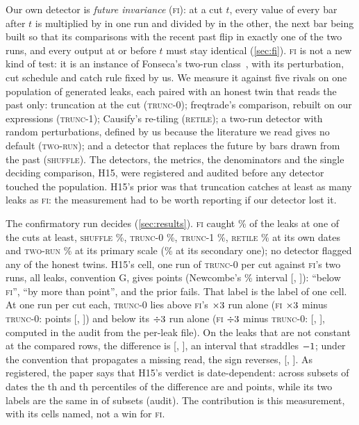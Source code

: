 \documentclass[11pt]{article}
\newcommand{\FI}{\textsc{fi}}
\newcommand{\TZ}{\textsc{trunc-0}}
\newcommand{\TO}{\textsc{trunc-1}}
\newcommand{\RT}{\textsc{retile}}
\newcommand{\TR}{\textsc{two-run}}
\newcommand{\SH}{\textsc{shuffle}}
\newcommand{\pct}{\%}
\begin{document}
Our own detector is \emph{future invariance} (\FI): at a cut $t$, every value of every bar after
$t$ is multiplied by \NumFIup{} in one run and divided by \NumFIdown{} in the other, the next bar
being built so that its comparisons with the recent past flip in exactly one of the two runs, and
every output at or before $t$ must stay identical (\cref{sec:fi}). \FI{} is not a new kind of
test: it is an instance of Fonseca's two-run class~\cite{fonseca2026}, %
with its perturbation, cut schedule and catch rule fixed by us. We measure it against five
rivals on one population of \NumPopN{} generated leaks, each paired with an honest twin that reads
the past only: truncation at the cut (\TZ); freqtrade's comparison, rebuilt on our expressions
(\TO); Causify's re-tiling (\RT); a two-run detector with random perturbations, defined by us
because the literature we read gives no default (\TR); and a detector that replaces the future by
bars drawn from the past (\SH). The detectors, the metrics, the denominators and the single
deciding comparison, H15, were registered and audited before any detector touched the population.
H15's prior was that truncation catches at least as many leaks as \FI{}: the measurement had to be
worth reporting if our detector lost it.

The confirmatory run decides (\cref{sec:results}). \FI{} caught \NumCFiAll\pct{} of the leaks at
one of the cuts at least, \SH{} \NumCShAll\pct, \TZ{} \NumCTzGAll\pct, \TO{} \NumCToGAll\pct,
\RT{} \NumCRtGAll\pct{} at its own dates and \TR{} \NumCTrAll\pct{} at its primary scale
(\NumCTrHiAll\pct{} at its secondary one); no detector flagged any of the
\NumCTwinsEval{} honest twins. H15's cell, one run of \TZ{} per cut against \FI's two runs, all
leaks, convention G, gives \NumCHDiff{} points (Newcombe's \NumConf\pct{} interval [\NumCHLo,
\NumCHHi]): ``below \FI'', ``by more than \NumHfifteenMargin{} point'', and the prior fails. That
label is the label of one cell. At one run per cut each, \TZ{} lies above \FI's $\times3$
run alone (\FI{} $\times3$ minus \TZ: \NumCEqFiUpTzDiff{} points [\NumCEqFiUpTzLo,
\NumCEqFiUpTzHi]) and below its $\div3$ run alone (\FI{} $\div3$ minus \TZ:
\NumDownDiff{} [\NumDownLo, \NumDownHi], computed in the audit from the per-leak file). On the leaks that are not constant at
the compared rows, the difference is \NumCQNcDiff{} [\NumCQNcLo, \NumCQNcHi], an interval that
straddles $-1$; under the convention that propagates a missing read, the sign
reverses, \NumCBPDiff{} [\NumCBPLo, \NumCBPHi]. As registered, the paper says that H15's verdict is
date-dependent: across \NumCBootSubsets{} subsets of \NumCBootPer{} dates the \NumBootPLo th and
\NumBootPHi th percentiles of the difference are \NumCBootLo{} and \NumCBootHi{} points, while its
two labels are the same in \NumLabelsSame{} of \NumLabelsOf{} subsets (audit). The contribution is
this measurement, with its cells named, not a win for \FI.
\end{document}
